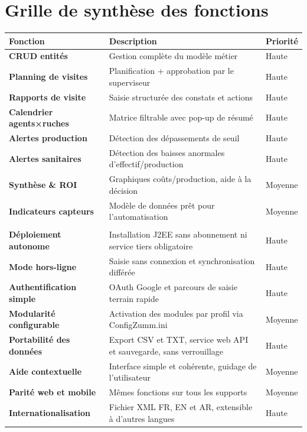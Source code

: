 \section{Grille de synthèse des fonctions}
\begin{longtable}{>{\bfseries}p{3.4cm} p{7.6cm} C{2.2cm}}
\toprule
\textbf{Fonction} & \textbf{Description} & \textbf{Priorité} \\
\midrule
\endhead
CRUD entités        & Gestion complète du modèle métier                       & Haute \\
Planning de visites & Planification + approbation par le superviseur           & Haute \\
Rapports de visite  & Saisie structurée des constats et actions               & Haute \\
Calendrier agents×ruches & Matrice filtrable avec pop-up de résumé            & Haute \\
Alertes production  & Détection des dépassements de seuil                     & Haute \\
Alertes sanitaires  & Détection des baisses anormales d'effectif/production   & Haute \\
Synthèse \& ROI     & Graphiques coûts/production, aide à la décision         & Moyenne \\
Indicateurs capteurs & Modèle de données prêt pour l'automatisation            & Moyenne \\
\midrule
{} \\
\midrule
Déploiement autonome & Installation J2EE sans abonnement ni service tiers obligatoire & Haute \\
Mode hors-ligne & Saisie sans connexion et synchronisation différée & Haute \\
Authentification simple & OAuth Google et parcours de saisie terrain rapide & Haute \\
Modularité configurable & Activation des modules par profil via ConfigZumm.ini & Moyenne \\
Portabilité des données & Export CSV et TXT, service web API et sauvegarde, sans verrouillage & Haute \\
Aide contextuelle & Interface simple et cohérente, guidage de l'utilisateur & Moyenne \\
Parité web et mobile & Mêmes fonctions sur tous les supports & Moyenne \\
Internationalisation & Fichier XML FR, EN et AR, extensible à d'autres langues & Haute \\

\end{longtable}
